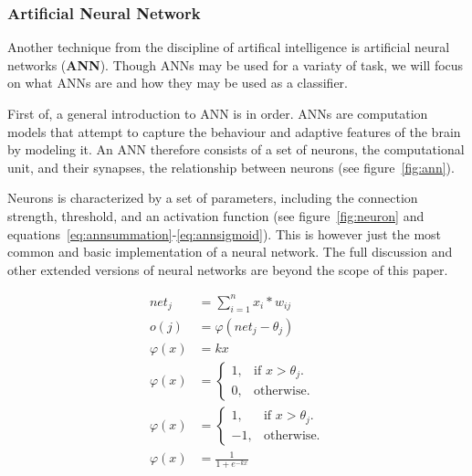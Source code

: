 \subsubsection{Artificial Neural Network}
	Another technique from the discipline of artifical intelligence is artificial neural networks (\textbf{ANN}).
	Though ANNs may be used for a variaty of task, we will focus on what ANNs are and how they may be used as
	a classifier. 
	
	\bigskip\noindent
	First of, a general introduction to ANN is in order. ANNs are computation models that attempt to capture
	the behaviour and adaptive features of the brain by modeling it.
	An ANN therefore consists of a set of neurons, the computational unit, and their synapses, the relationship between neurons (see figure~\ref{fig:ann}).
	
	
	\bigskip\noindent
	Neurons is characterized by a set of parameters, including the connection strength, threshold, and an activation function
	(see figure~\ref{fig:neuron} and equations~\ref{eq:annsummation}-\ref{eq:annsigmoid}). 
	This is however just the most common and basic implementation of a neural network. 
	The full discussion and other extended versions of neural networks are beyond the scope of this paper.
	
	\begin{figure}
		\begin{align}
			net_j &= \sum_{i=1}^n x_i*w_{ij}\label{eq:annsummation}\\
			o(j) &= \varphi (net_j - \theta_j)\label{eq:annthreshold}\\
			\varphi(x) &= kx\label{eq:annlinear}\\
			\varphi(x) &= \begin{cases}
					1, & \text{if $x > \theta_j$}.\\
					0, & \text{otherwise.}
				\end{cases}\label{eq:annbinary}\\
			\varphi(x) &= \begin{cases}
					1, & \text{if $x > \theta_j$}.\\
					-1, & \text{otherwise.}
				\end{cases}\label{eq:annbipolar}\\
			\varphi(x) &= \frac{1}{1+e^{-kx}}\label{eq:annsigmoid}
		\end{align}
	\end{figure}
	
